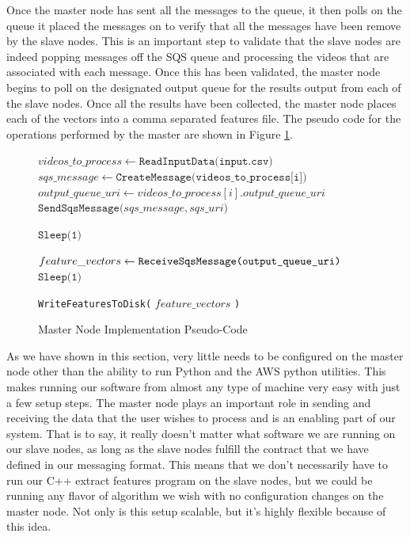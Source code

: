 Once the master node has sent all the messages to the queue, it then polls
on the queue it placed the messages on to verify that all the messages have been
remove by the slave nodes. This is an important step to validate that the
slave nodes are indeed popping messages off the SQS queue and processing
the videos that are associated with each message. Once this has been validated,
the master node begins to poll on the designated output queue for the results output
from each of the slave nodes. Once all the results have been collected, the master
node places each of the vectors into a comma separated features file.
The pseudo code for the operations performed by the master are shown in Figure
\ref{alg:master_node}.

\begin{figure}[h]
\begin{algorithmic}[1]
  \State $videos\_to\_process \gets \texttt{ReadInputData(input.csv)}$
    \State $sqs\_message \gets \texttt{CreateMessage(videos\_to\_process[i])}$
    \State $output\_queue\_uri \gets videos\_to\_process[i].output\_queue\_uri$
    \State$\texttt{SendSqsMessage(}sqs\_message, sqs\_uri \texttt{)}$
  \EndFor

   
    \State $\texttt{Sleep(1)}$
  \EndWhile

    \State $feature\_vectors \gets \texttt{ReceiveSqsMessage(output\_queue\_uri\texttt{)}}$
    \State $\texttt{Sleep(1)}$
  \EndWhile

  \State \texttt{WriteFeaturesToDisk(} $feature\_vectors$ \texttt{)}

\end{algorithmic}
\caption{Master Node Implementation Pseudo-Code}
\label{alg:master_node}
\end{figure}

As we have shown in this section, very little needs to be configured on the master
node other than the ability to run Python and the AWS python utilities. This
makes running our software from almost any type of machine very easy with just a
few setup steps. The master node plays an important role in sending and receiving
the data that the user wishes to process and is an enabling part of our system.
That is to say, it really doesn't matter what software we are running on our
slave nodes, as long as the slave nodes fulfill the contract that we have
defined in our messaging format. This means that we don't necessarily have to
run our C++ extract features program on the slave nodes, but we could be running
any flavor of algorithm we wish with no configuration changes on the master node.
Not only is this setup scalable, but it's highly flexible because of this idea.

